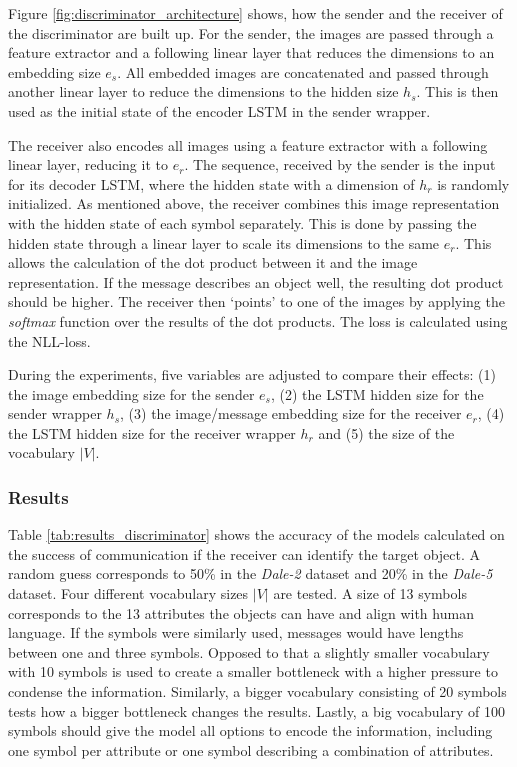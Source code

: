 Figure \ref{fig:discriminator_architecture} shows, how the sender and the receiver of the discriminator are built up.
For the sender, the images are passed through a feature extractor and a following linear layer that reduces the dimensions to an embedding size $e_s$.
All embedded images are concatenated and passed through another linear layer to reduce the dimensions to the hidden size $h_s$.
This is then used as the initial state of the encoder LSTM in the sender wrapper.

The receiver also encodes all images using a feature extractor with a following linear layer, reducing it to $e_r$.
The sequence, received by the sender is the input for its decoder LSTM, where the hidden state with a dimension of $h_r$ is randomly initialized.
As mentioned above, the receiver combines this image representation with the hidden state of each symbol separately.
This is done by passing the hidden state through a linear layer to scale its dimensions to the same $e_r$.
This allows the calculation of the dot product between it and the image representation.
If the message describes an object well, the resulting dot product should be higher.
The receiver then `points' to one of the images by applying the \emph{softmax} function over the results of the dot products.
The loss is calculated using the NLL-loss.

During the experiments, five variables are adjusted to compare their effects:
(1) the image embedding size for the sender $e_s$, (2) the LSTM hidden size for the sender wrapper $h_s$, (3) the image/message embedding size for the receiver $e_r$, (4) the LSTM hidden size for the receiver wrapper $h_r$ and (5) the size of the vocabulary $|V|$.

\subsubsection*{Results}
Table \ref{tab:results_discriminator} shows the accuracy of the models calculated on the success of communication if the receiver can identify the target object.
A random guess corresponds to 50\% in the \emph{Dale-2} dataset and 20\% in the \emph{Dale-5} dataset.
Four different vocabulary sizes $|V|$ are tested.
A size of 13 symbols corresponds to the 13 attributes the objects can have and align with human language.
If the symbols were similarly used, messages would have lengths between one and three symbols.
Opposed to that a slightly smaller vocabulary with 10 symbols is used to create a smaller bottleneck with a higher pressure to condense the information.
Similarly, a bigger vocabulary consisting of 20 symbols tests how a bigger bottleneck changes the results.
Lastly, a big vocabulary of 100 symbols should give the model all options to encode the information, including one symbol per attribute or one symbol describing a combination of attributes.

